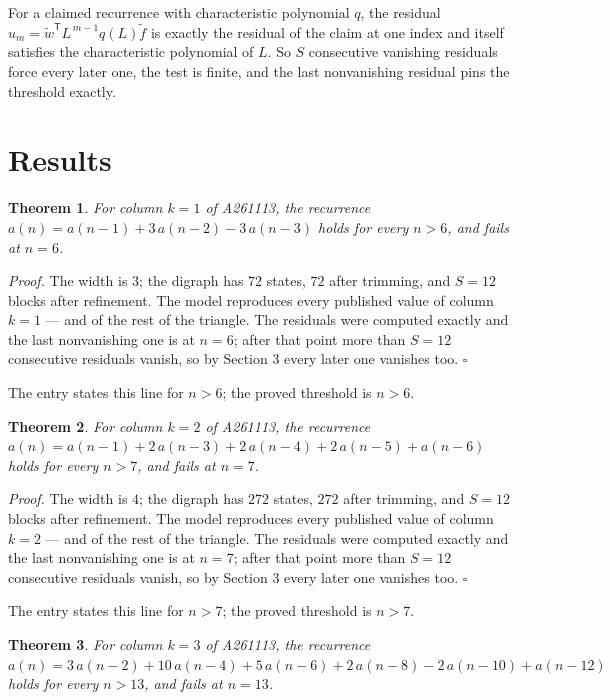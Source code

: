 \documentclass[11pt]{article}
\newtheorem{theorem}{Theorem}
\theoremstyle{definition}
\begin{document}
For a claimed recurrence with characteristic polynomial $q$, the residual $u_m = \tilde w^{\mathsf T}L^{\,m-1}q(L)\tilde f$ is exactly the residual of the claim at one index and itself satisfies the characteristic polynomial of $L$. So $S$ consecutive vanishing residuals force every later one, the test is finite, and the last nonvanishing residual pins the threshold exactly.

\section{Results}

\begin{theorem} For column $k = 1$ of A261113, the recurrence $a(n) = a(n-1) + 3\,a(n-2) - 3\,a(n-3)$ holds for every $n > 6$, and fails at $n = 6$.\end{theorem}

{\itshape Proof.} The width is $3$; the digraph has $72$ states, $72$ after trimming, and $S = 12$ blocks after refinement. The model reproduces every published value of column $k = 1$ --- and of the rest of the triangle. The residuals were computed exactly and the last nonvanishing one is at $n = 6$; after that point more than $S = 12$ consecutive residuals vanish, so by Section 3 every later one vanishes too. $\square$

The entry states this line for $n > 6$; the proved threshold is $n > 6$.

\begin{theorem} For column $k = 2$ of A261113, the recurrence $a(n) = a(n-1) + 2\,a(n-3) + 2\,a(n-4) + 2\,a(n-5) + a(n-6)$ holds for every $n > 7$, and fails at $n = 7$.\end{theorem}

{\itshape Proof.} The width is $4$; the digraph has $272$ states, $272$ after trimming, and $S = 12$ blocks after refinement. The model reproduces every published value of column $k = 2$ --- and of the rest of the triangle. The residuals were computed exactly and the last nonvanishing one is at $n = 7$; after that point more than $S = 12$ consecutive residuals vanish, so by Section 3 every later one vanishes too. $\square$

The entry states this line for $n > 7$; the proved threshold is $n > 7$.

\begin{theorem} For column $k = 3$ of A261113, the recurrence $a(n) = 3\,a(n-2) + 10\,a(n-4) + 5\,a(n-6) + 2\,a(n-8) - 2\,a(n-10) + a(n-12)$ holds for every $n > 13$, and fails at $n = 13$.\end{theorem}
\end{document}
